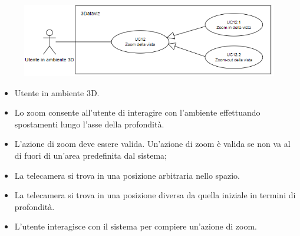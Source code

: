 \begin{figure}[h!]\centering
    \includegraphics[scale=0.6]{template/images/UC12.png}
    \caption{}
\end{figure}
\UCdsc
{ %
    \begin{itemize}
        \item Utente in ambiente 3D.
    \end{itemize}
}
{ %
    \begin{itemize}
        \item Lo zoom consente all'utente di interagire con l'ambiente effettuando spostamenti lungo l'asse della profondità.
    \end{itemize}
}
{ %
    \begin{itemize}
        \item L'azione di zoom deve essere valida. Un'azione di zoom è valida se non va al di fuori di un'area predefinita dal sistema;
        \item La telecamera si trova in una posizione arbitraria nello spazio.
    \end{itemize}
}
{ %
    \begin{itemize}
        \item La telecamera si trova in una posizione diversa da quella iniziale in termini di profondità.
    \end{itemize}
}
{ %
    \begin{itemize}
        \item L'utente interagisce con il sistema per compiere un'azione di zoom.
    \end{itemize}
} 

